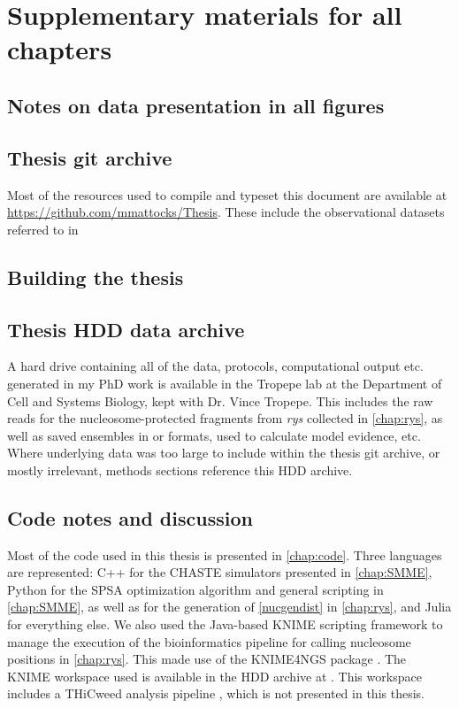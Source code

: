 \chapter{Supplementary materials for all chapters}
\section{Notes on data presentation in all figures}


\section{Thesis git archive}
Most of the resources used to compile and typeset this document are available at \url{https://github.com/mmattocks/Thesis}. These include the observational datasets referred to in

\section{Building the thesis}

\section{Thesis HDD data archive}
\label{sec:archive}
A hard drive containing all of the data, protocols, computational output etc. generated in my PhD work is available in the Tropepe lab at the Department of Cell and Systems Biology, kept with Dr. Vince Tropepe. This includes the raw reads for the nucleosome-protected fragments from \textit{rys} collected in \autoref{chap:rys}, as well as saved ensembles in  or  formats, used to calculate model evidence, etc. Where underlying data was too large to include within the thesis git archive, or mostly irrelevant, methods sections reference this HDD archive. 

\section{Code notes and discussion}
Most of the code used in this thesis is presented in \autoref{chap:code}. Three languages are represented: C++ for the CHASTE simulators presented in \autoref{chap:SMME}, Python for the SPSA optimization algorithm and general scripting in \autoref{chap:SMME}, as well as for the generation of \autoref{nucgendist} in \autoref{chap:rys}, and Julia for everything else. We also used the Java-based KNIME scripting framework to manage the execution of the bioinformatics pipeline for calling nucleosome positions in \autoref{chap:rys}. This made use of the KNIME4NGS package \cite{Hastreiter2017}. The KNIME workspace used is available in the HDD archive at . This workspace includes a THiCweed analysis pipeline \cite{Agrawal2017}, which is not presented in this thesis.

